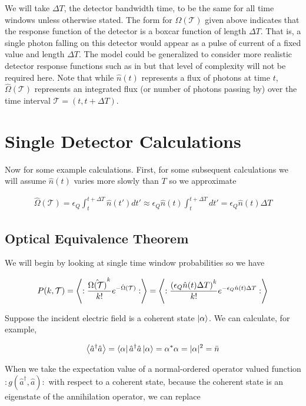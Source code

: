 \documentclass[12pt]{article}
\newcommand{\ep}{\epsilon}
\newcommand{\mc}[1]{\mathcal{#1}}
\begin{document}
We will take $\Delta T$, the detector bandwidth time, to be the same for all time windows unless otherwise stated. The form for $\Omega(\mc{T})$ given above indicates that the response function of the detector is a boxcar function of length $\Delta T$. That is, a single photon falling on this detector would appear as a pulse of current of a fixed value and length $\Delta T$. The model could be generalized to consider more realistic detector response functions such as in \cite{Ou1995} but that level of complexity will not be required here. Note that while $\hat{n}(t)$ represents a flux of photons at time $t$, $\hat{\Omega}(\mc{T})$ represents an integrated flux (or number of photons passing by) over the time interval $\mc{T} =  (t, t+\Delta T)$.

\section{Single Detector Calculations}
Now for some example calculations. First, for some subsequent calculations we will assume $\hat{n}(t)$ varies more slowly than $T$ so we approximate

\begin{align}
\hat{\Omega}(\mc{T}) = \ep_Q\int_t^{t+\Delta T} \hat{n}(t') dt' \approx \ep_Q \hat{n}(t) \int_t^{t+\Delta T} dt' =  \ep_Q \hat{n}(t)\Delta T
\end{align} 

\subsection{Optical Equivalence Theorem}

We will begin by looking at single time window probabilities so we have

\begin{align}
P(k, \mc{T}) = \Braket{: \frac{\hat{\Omega(\mc{T})}^k}{k!}e^{-\hat{\Omega}(\mc{T})}:}= \Braket{:\frac{\left(\ep_Q \hat{n}(t)\Delta T \right)^k}{k!}e^{-\ep_Q \hat{n}(t) \Delta T}:}
\end{align}

Suppose the incident electric field is a coherent state $\ket{\alpha}$. We can calculate, for example,

\begin{align}
\Braket{\hat{a}^{\dag} \hat{a}} = \bra{\alpha}\hat{a}^{\dag} \hat{a} \ket{\alpha} = \alpha^* \alpha = |\alpha|^2 = \bar{n}
\end{align}

When we take the expectation value of a normal-ordered operator valued function $:g(\hat{a}^{\dag},\hat{a}):$ with respect to a coherent state, because the coherent state is an eigenstate of the annihilation operator, we can replace
\end{document}

